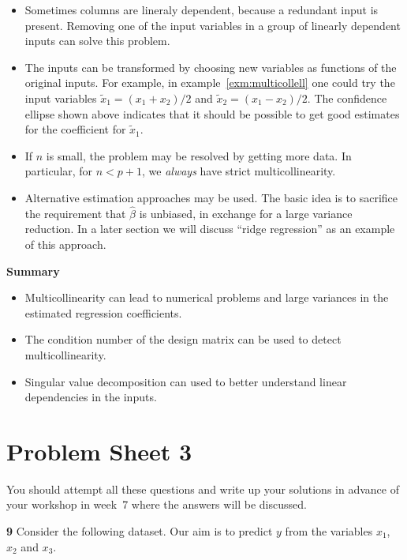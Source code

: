 \documentclass[
  a4paper,
]{article}
\providecommand{\tightlist}{%
  \setlength{\itemsep}{0pt}\setlength{\parskip}{0pt}}
\theoremstyle{definition}
\theoremstyle{definition}
\theoremstyle{definition}
\theoremstyle{definition}
\theoremstyle{remark}
\begin{document}
\begin{itemize}
\item
  Sometimes columns are lineraly dependent, because a redundant input
  is present. Removing one of the input variables in a group
  of linearly dependent inputs can solve this problem.
\item
  The inputs can be transformed by choosing new variables as functions
  of the original inputs. For example, in example~\ref{exm:multicollell}
  one could try the input variables \(\tilde x_1 = (x_1 + x_2) / 2\) and
  \(\tilde x_2 = (x_1 - x_2) / 2\). The confidence ellipse shown above
  indicates that it should be possible to get good estimates for the
  coefficient for \(\tilde x_1\).
\item
  If \(n\) is small, the problem may be resolved by getting more data.
  In particular, for \(n < p+1\), we \emph{always} have strict multicollinearity.
\item
  Alternative estimation approaches may be used. The basic idea is to sacrifice the
  requirement that \(\hat\beta\) is unbiased, in exchange for a large variance
  reduction. In a later section we will discuss ``ridge regression'' as an
  example of this approach.
\end{itemize}

\textbf{Summary}

\begin{itemize}
\tightlist
\item
  Multicollinearity can lead to numerical problems and large variances in the
  estimated regression coefficients.
\item
  The condition number of the design matrix can be used to detect
  multicollinearity.
\item
  Singular value decomposition can used to better understand linear
  dependencies in the inputs.
\end{itemize}

\clearpage

\hypertarget{P03}{%
\section*{Problem Sheet 3}\label{P03}}

You should attempt all these questions and write up your solutions in advance
of your workshop in week~7 where the answers will be discussed.

\textbf{9} Consider the following dataset. Our aim is to predict \(y\) from the
variables \(x_1\), \(x_2\) and \(x_3\).
\end{document}
